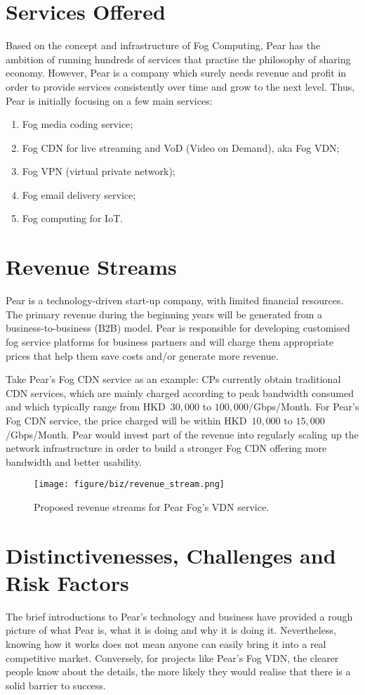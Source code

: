 \section{Services Offered}
Based on the concept and infrastructure of Fog Computing, Pear has the ambition of running hundreds of services that practise the philosophy of sharing economy. However, Pear is a company which surely needs revenue and profit in order to provide services consistently over time and grow to the next level. Thus, Pear is initially focusing on a few main services: 
\begin{enumerate}
	\item Fog media coding service;
	\item Fog CDN for live streaming and VoD (Video on Demand), aka Fog VDN;
	\item Fog VPN (virtual private network);
	\item Fog email delivery service;
	\item Fog computing for IoT.
\end{enumerate}

\section{Revenue Streams}
Pear is a technology-driven start-up company, with limited financial resources. The primary revenue during the beginning years will be generated from a business-to-business (B2B) model. Pear is responsible for developing customised fog service platforms for business partners and will charge them appropriate prices that help them save costs and/or generate more revenue. 

Take Pear's Fog CDN service as an example: CPs currently obtain traditional CDN services, which are mainly charged according to peak bandwidth consumed and which typically range from HKD~$30,000$ to $100,000$/Gbps/Month. For Pear's Fog CDN service, the price charged will be within HKD~$10,000$ to $15,000$/Gbps/Month. Pear would invest part of the revenue into regularly scaling up the network infrastructure in order to build a stronger Fog CDN offering more bandwidth and better usability. 

\begin{figure}[ht]
	\centering
	\texttt{[image: figure/biz/revenue\_stream.png]}
	\caption{Proposed revenue streams for Pear Fog's VDN service.} \label{fig:vdn-revenue-stream}
\end{figure}

\section{Distinctivenesses, Challenges and Risk Factors}
The brief introductions to Pear's technology and business have provided a rough picture of what Pear is, what it is doing and why it is doing it. Nevertheless, knowing how it works does not mean anyone can easily bring it into a real competitive market. Conversely, for projects like Pear's Fog VDN, the clearer people know about the details, the more likely they would realise that there is a solid barrier to success. 

